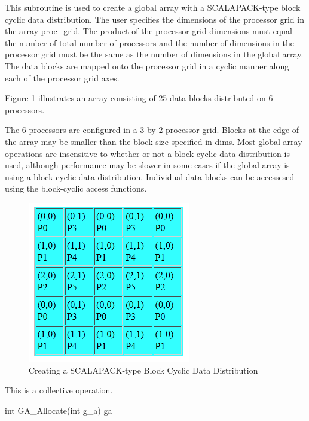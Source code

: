 \documentclass[12pt]{article}
\begin{document}
\begin{desc}

  This subroutine is used to create a global array with a
  SCALAPACK-type block cyclic data distribution. The user specifies
  the dimensions of the processor grid in the array proc_grid. The
  product of the processor grid dimensions must equal the number of
  total number of processors and the number of dimensions in the
  processor grid must be the same as the number of dimensions in the
  global array. The data blocks are mapped onto the processor grid in
  a cyclic manner along each of the processor grid axes. 

Figure \ref{setblkcyprocgrid} illustrates an array consisting of 25 data blocks distributed on 6 processors.

The 6 processors are configured in a 3 by 2 processor grid. Blocks at
the edge of the array may be smaller than the block size specified in dims.
Most global array operations  are insensitive to whether or not a block-cyclic
data distribution is used, although performance may be slower in some cases
if the global array is using a block-cyclic data distribution. Individual data
blocks can be accessesed using the block-cyclic access functions.

\begin{figure}
\centering
\includegraphics{SetBlkCyProcGrid}
\caption{Creating a SCALAPACK-type Block Cyclic Data Distribution}
\label{setblkcyprocgrid}
\end{figure}

  This is a collective operation.

\end{desc}


\begin{capi}
int GA_Allocate(int g_a)
   ga                                                                     \access{[input]} 
\end{capi}
\end{document}
